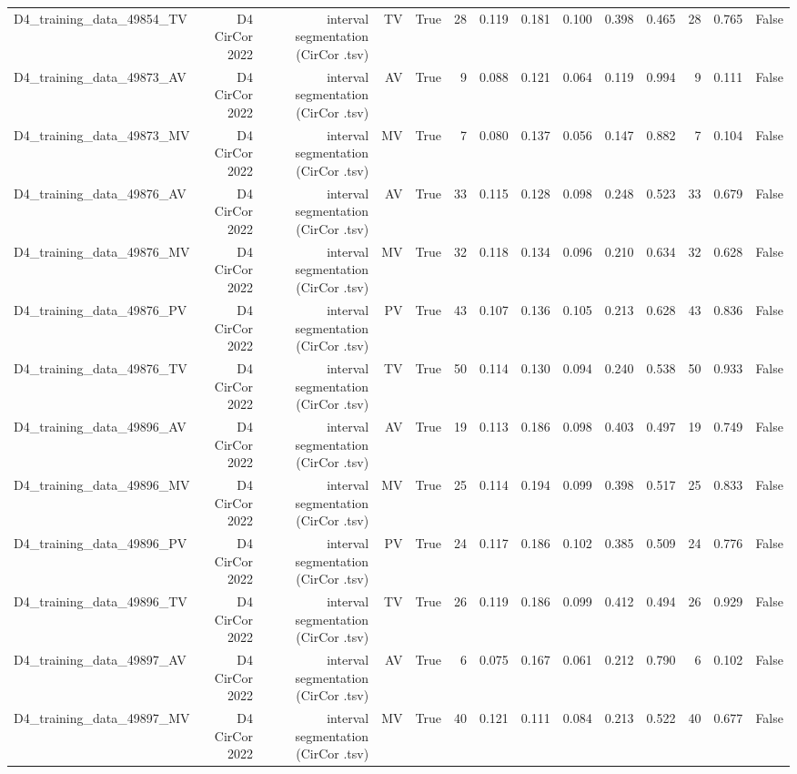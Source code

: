 \begin{table}[htbp]
\begin{tabular}{lrrrrrrrrrrrrr}
    D4\_training\_data\_49854\_TV & D4 CirCor 2022 & interval segmentation (CirCor .tsv) & TV & True & 28 & 0.119 & 0.181 & 0.100 & 0.398 & 0.465 & 28 & 0.765 & False \\
    D4\_training\_data\_49873\_AV & D4 CirCor 2022 & interval segmentation (CirCor .tsv) & AV & True & 9 & 0.088 & 0.121 & 0.064 & 0.119 & 0.994 & 9 & 0.111 & False \\
    D4\_training\_data\_49873\_MV & D4 CirCor 2022 & interval segmentation (CirCor .tsv) & MV & True & 7 & 0.080 & 0.137 & 0.056 & 0.147 & 0.882 & 7 & 0.104 & False \\
    D4\_training\_data\_49876\_AV & D4 CirCor 2022 & interval segmentation (CirCor .tsv) & AV & True & 33 & 0.115 & 0.128 & 0.098 & 0.248 & 0.523 & 33 & 0.679 & False \\
    D4\_training\_data\_49876\_MV & D4 CirCor 2022 & interval segmentation (CirCor .tsv) & MV & True & 32 & 0.118 & 0.134 & 0.096 & 0.210 & 0.634 & 32 & 0.628 & False \\
    D4\_training\_data\_49876\_PV & D4 CirCor 2022 & interval segmentation (CirCor .tsv) & PV & True & 43 & 0.107 & 0.136 & 0.105 & 0.213 & 0.628 & 43 & 0.836 & False \\
    D4\_training\_data\_49876\_TV & D4 CirCor 2022 & interval segmentation (CirCor .tsv) & TV & True & 50 & 0.114 & 0.130 & 0.094 & 0.240 & 0.538 & 50 & 0.933 & False \\
    D4\_training\_data\_49896\_AV & D4 CirCor 2022 & interval segmentation (CirCor .tsv) & AV & True & 19 & 0.113 & 0.186 & 0.098 & 0.403 & 0.497 & 19 & 0.749 & False \\
    D4\_training\_data\_49896\_MV & D4 CirCor 2022 & interval segmentation (CirCor .tsv) & MV & True & 25 & 0.114 & 0.194 & 0.099 & 0.398 & 0.517 & 25 & 0.833 & False \\
    D4\_training\_data\_49896\_PV & D4 CirCor 2022 & interval segmentation (CirCor .tsv) & PV & True & 24 & 0.117 & 0.186 & 0.102 & 0.385 & 0.509 & 24 & 0.776 & False \\
    D4\_training\_data\_49896\_TV & D4 CirCor 2022 & interval segmentation (CirCor .tsv) & TV & True & 26 & 0.119 & 0.186 & 0.099 & 0.412 & 0.494 & 26 & 0.929 & False \\
    D4\_training\_data\_49897\_AV & D4 CirCor 2022 & interval segmentation (CirCor .tsv) & AV & True & 6 & 0.075 & 0.167 & 0.061 & 0.212 & 0.790 & 6 & 0.102 & False \\
    D4\_training\_data\_49897\_MV & D4 CirCor 2022 & interval segmentation (CirCor .tsv) & MV & True & 40 & 0.121 & 0.111 & 0.084 & 0.213 & 0.522 & 40 & 0.677 & False \\

\end{tabular}
\end{table}
